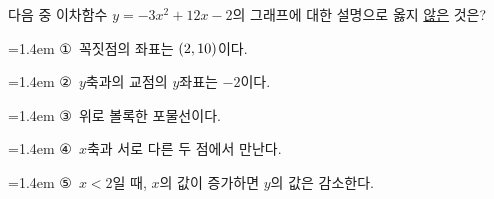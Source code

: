다음 중 이차함수 $y=-3x^2+12x-2$의 그래프에 대한 설명으로 옳지 \underline{않은} 것은?
\par\medskip\par\noindent\hangindent=1.4em {\small ①}\ 꼭짓점의 좌표는 $(2{,}\mkern3mu\mathopen{}10)$이다.\par\noindent\hangindent=1.4em {\small ②}\ $y$축과의 교점의 $y$좌표는 $-2$이다.\par\noindent\hangindent=1.4em {\small ③}\ 위로 볼록한 포물선이다.\par\noindent\hangindent=1.4em {\small ④}\ $x$축과 서로 다른 두 점에서 만난다.\par\noindent\hangindent=1.4em {\small ⑤}\ $x<2$일 때, $x$의 값이 증가하면 $y$의 값은 감소한다.\par\medskip
